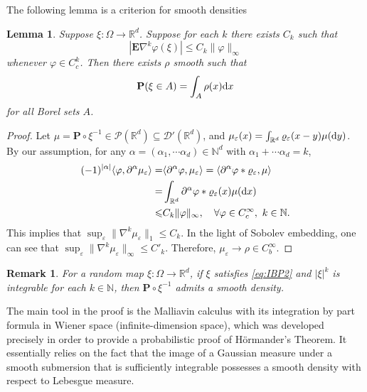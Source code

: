 \documentclass[twoside, 12pt]{book}
\numberwithin{equation}{chapter}
\newtheorem{lemma}[theorem]{Lemma}
\newtheorem{remark}[theorem]{Remark}
\def\mN{{\mathbb N}}
\def\mR{{\mathbb R}}
\def\bP{{\mathbf P}}
\def\sD{{\mathscr D}}
\def\sP{{\mathscr P}}
\def\<{\langle}
\def\>{\rangle}
\def\leq{\leqslant}
\def\d{\text{\rm{d}}}
\def\eps{\varepsilon}
\begin{document}
    The following lemma is a criterion for smooth densities 
    \begin{lemma}
        Suppose $\xi: \Omega \rightarrow \mathbb{R}^d$. Suppose for each $k$ there exists $C_k$ such that
        $$
         \left|\mathbf{E}\nabla^k \varphi(\xi)\right| \leq C_k\|\varphi\|_{\infty}
        $$
        whenever $\varphi \in C^k_c$. Then there exists $\rho$ smooth such that
        $$
        \mathbf{P}(\xi \in A)=\int_A \rho(x) \d x
        $$
        for all Borel sets $A$.
    \end{lemma}
    \begin{proof}
        Let $\mu=\bP\circ \xi^{-1}\in \sP(\mR^d)\subseteq\sD'(\mR^d)$, and $\mu_\eps(x)=\int_{\mR^d}\varrho_\eps(x-y)\mu(\d y)$. By our assumption, for any $\alpha=(\alpha_1,\cdots\alpha_d)\in \mN^d$ with $\alpha_1+\cdots\alpha_d=k$, 
        \[
        \begin{aligned}
            (-1)^{|\alpha|}\<\varphi, \partial^\alpha\mu_\eps\>=&\<\partial^\alpha \varphi, \mu_\eps\>=\<\partial^\alpha \varphi*\varrho_\eps, \mu\>\\
            =&\int_{\mR^d}\partial^\alpha \varphi*\varrho_\eps(x) \mu(\d x)\\
            \leq& C_k\|\varphi\|_\infty, \quad \forall \varphi\in C_c^\infty,~ k\in \mN.
        \end{aligned}
        \]
         This implies that $\sup_{\eps} \|\nabla^k\mu_\eps\|_1\leq C_k$. In the light of Sobolev embedding, one can see that $\sup_{\eps}\|\nabla^k\mu_\eps\|_\infty\leq C'_k$. Therefore, $\mu_\eps\to \rho\in C_b^\infty$. 
    \end{proof}
    \begin{remark}
        For a random map $\xi:\Omega\to \mR^d$, if $\xi$ satisfies \eqref{eq:IBP2} and $|\xi|^k$ is integrable for each $k\in \mN$, then $\bP\circ\xi^{-1}$ admits a smooth density.  
    \end{remark}

    The main tool in the proof is the Malliavin calculus with its integration by part formula in Wiener space (infinite-dimension space), which was developed precisely in order to provide a probabilistic proof of Hörmander's Theorem. It essentially relies on the fact that the image of a Gaussian measure under a smooth submersion that is sufficiently integrable possesses a smooth density with respect to Lebesgue measure. 
    
\end{document}
